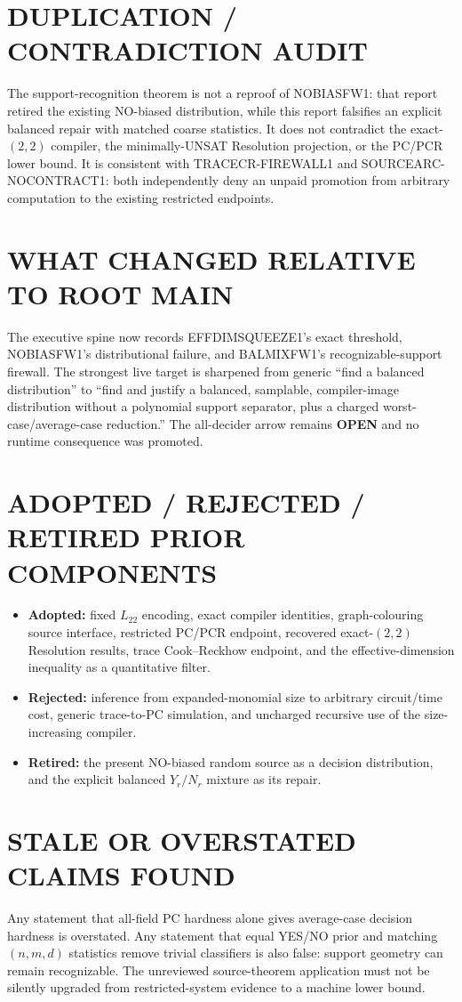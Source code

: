 \documentclass[11pt]{article}
\newcommand{\Ltwo}{L_{22}}
\newcommand{\OPEN}{\textbf{OPEN}}
\begin{document}
\section{DUPLICATION / CONTRADICTION AUDIT}
The support-recognition theorem is not a reproof of NOBIASFW1: that report
retired the existing NO-biased distribution, while this report falsifies an
explicit balanced repair with matched coarse statistics.  It does not
contradict the exact-$(2,2)$ compiler, the minimally-UNSAT Resolution
projection, or the PC/PCR lower bound.  It is consistent with
TRACECR-FIREWALL1 and SOURCEARC-NOCONTRACT1: both independently deny an
unpaid promotion from arbitrary computation to the existing restricted
endpoints.

\section{WHAT CHANGED RELATIVE TO ROOT MAIN}
The executive spine now records EFFDIMSQUEEZE1's exact threshold,
NOBIASFW1's distributional failure, and BALMIXFW1's recognizable-support
firewall.  The strongest live target is sharpened from generic ``find a
balanced distribution'' to ``find and justify a balanced, samplable,
compiler-image distribution without a polynomial support separator, plus a
charged worst-case/average-case reduction.''  The all-decider arrow remains
\OPEN{} and no runtime consequence was promoted.

\section{ADOPTED / REJECTED / RETIRED PRIOR COMPONENTS}
\begin{itemize}
\item \textbf{Adopted:} fixed $\Ltwo$ encoding, exact compiler identities,
  graph-colouring source interface, restricted PC/PCR endpoint, recovered
  exact-$(2,2)$ Resolution results, trace Cook--Reckhow endpoint, and the
  effective-dimension inequality as a quantitative filter.
\item \textbf{Rejected:} inference from expanded-monomial size to arbitrary
  circuit/time cost, generic trace-to-PC simulation, and uncharged recursive
  use of the size-increasing compiler.
\item \textbf{Retired:} the present NO-biased random source as a decision
  distribution, and the explicit balanced $Y_r/N_r$ mixture as its repair.
\end{itemize}

\section{STALE OR OVERSTATED CLAIMS FOUND}
Any statement that all-field PC hardness alone gives average-case decision
hardness is overstated.  Any statement that equal YES/NO prior and matching
$(n,m,d)$ statistics remove trivial classifiers is also false: support
geometry can remain recognizable.  The unreviewed source-theorem application
must not be silently upgraded from restricted-system evidence to a machine
lower bound.
\end{document}
